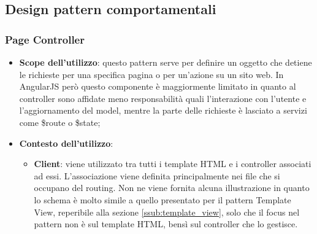 %


\subsection{Design pattern comportamentali} %
\label{sub:design_pattern_comportamentali}
	\subsubsection{Page Controller} %
	\label{ssub:page_controller}
	\begin{itemize}
		\item \textbf{Scope dell'utilizzo}: questo pattern serve per definire un oggetto che detiene le richieste per una specifica pagina o per un'azione su un sito web. In AngularJS però questo componente è maggiormente limitato in quanto al controller sono affidate meno responsabilità quali l'interazione con l'utente e l'aggiornamento del model, mentre la parte delle richieste è lasciato a servizi come \$route o \$state;
		\item \textbf{Contesto dell'utilizzo}:
			\begin{itemize}
				\item \textbf{Client}: viene utilizzato tra tutti i template HTML e i controller associati ad essi. L'associazione viene definita principalmente nei file che si occupano del routing. \newline
				Non ne viene fornita alcuna illustrazione in quanto lo schema è molto simile a quello presentato per il pattern Template View, reperibile alla sezione \ref{ssub:template_view}, solo che il focus nel pattern non è sul template HTML, bensì sul controller che lo gestisce.
			\end{itemize}
	\end{itemize}


